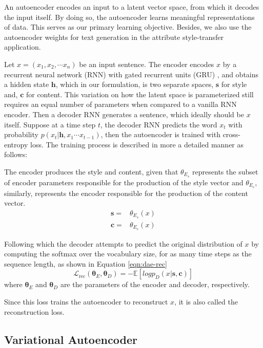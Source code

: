 An autoencoder encodes an input to a latent vector space, from which it decodes the input itself. By doing so, the autoencoder learns meaningful representations of data. This serves as our primary learning objective. Besides, we also use the autoencoder weights  for text generation in the attribute style-transfer application.

Let $x=(x_1, x_2, \cdots x_n)$ be an input sentence. The encoder encodes $x$ by a recurrent neural network (RNN) with gated recurrent units (GRU) \citep{cho2014learning}, and obtains a hidden state $\bm h$, which in our formulation, is two separate spaces, $\bm s$ for style and, $\bm c$ for content. This variation on how the latent space is parameterized still requires an equal number of parameters when compared to a vanilla RNN encoder. Then a decoder RNN generates a sentence, which ideally should be $x$ itself. Suppose at a time step $t$, the decoder RNN predicts the word $x_t$ with probability $p(x_t | \bm h, x_1 \cdots x_{t-1})$, then the autoencoder is trained with cross-entropy loss. The training process is described in more a detailed manner as follows:

The encoder produces the style and content, given that $\theta_{E_s}$ represents the subset of encoder parameters responsible for the production of the style vector and $\theta_{E_c}$, similarly, represents the encoder responsible for the production of the content vector.
\begin{align*}
	\bm s =
	 & \theta_{E_s}(x) \nonumber \\
	\bm c =
	 & \theta_{E_c}(x) \nonumber
\end{align*}

Following which the decoder attempts to predict the original distribution of $x$ by computing the softmax over the vocabulary size, for as many time steps as the sequence length, as shown in Equation \ref{eqn:dae-rec}
\begin{equation} \label{eqn:dae-rec}
	\mathcal{L}_\text{rec}(\bm\theta_E,\bm\theta_D)= -\mathbb{E}[log p_D(x|\bm s, \bm c)]
\end{equation}
where $\bm\theta_E$ and $\bm\theta_D$ are the parameters of the encoder and decoder, respectively.

Since this loss trains the autoencoder to reconstruct $x$, it is also called the reconstruction loss.


\subsection{Variational Autoencoder}

